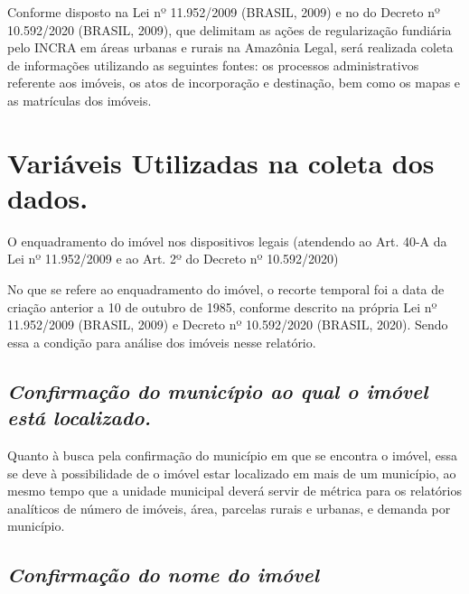 \documentclass[
  letterpaper,
]{report}
\begin{document}
Conforme disposto na Lei nº 11.952/2009 (BRASIL, 2009) e no do Decreto
nº 10.592/2020 (BRASIL, 2009), que delimitam as ações de regularização
fundiária pelo INCRA em áreas urbanas e rurais na Amazônia Legal, será
realizada coleta de informações utilizando as seguintes fontes: os
processos administrativos referente aos imóveis, os atos de incorporação
e destinação, bem como os mapas e as matrículas dos imóveis.

\hypertarget{variuxe1veis-utilizadas-na-coleta-dos-dados.}{%
\section{Variáveis Utilizadas na coleta dos
dados.}\label{variuxe1veis-utilizadas-na-coleta-dos-dados.}}

O enquadramento do imóvel nos dispositivos legais (atendendo ao Art.
40-A da Lei nº 11.952/2009 e ao Art. 2º do Decreto nº 10.592/2020)

No que se refere ao enquadramento do imóvel, o recorte temporal foi a
data de criação anterior a 10 de outubro de 1985, conforme descrito na
própria Lei nº 11.952/2009 (BRASIL, 2009) e Decreto nº 10.592/2020
(BRASIL, 2020). Sendo essa a condição para análise dos imóveis nesse
relatório.

\hypertarget{confirmauxe7uxe3o-do-municuxedpio-ao-qual-o-imuxf3vel-estuxe1-localizado.}{%
\subsection{\texorpdfstring{\emph{Confirmação do município ao qual o
imóvel está
localizado.}}{Confirmação do município ao qual o imóvel está localizado.}}\label{confirmauxe7uxe3o-do-municuxedpio-ao-qual-o-imuxf3vel-estuxe1-localizado.}}

Quanto à busca pela confirmação do município em que se encontra o
imóvel, essa se deve à possibilidade de o imóvel estar localizado em
mais de um município, ao mesmo tempo que a unidade municipal deverá
servir de métrica para os relatórios analíticos de número de imóveis,
área, parcelas rurais e urbanas, e demanda por município.

\hypertarget{confirmauxe7uxe3o-do-nome-do-imuxf3vel}{%
\subsection{\texorpdfstring{\emph{Confirmação do nome do
imóvel}}{Confirmação do nome do imóvel}}\label{confirmauxe7uxe3o-do-nome-do-imuxf3vel}}
\end{document}
